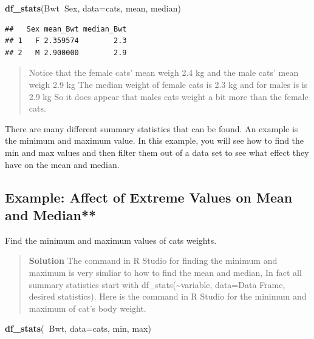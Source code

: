 \documentclass[]{book}
\newenvironment{Shaded}{\begin{snugshade}}{\end{snugshade}}
\newcommand{\DataTypeTok}[1]{\textcolor[rgb]{0.13,0.29,0.53}{#1}}
\newcommand{\KeywordTok}[1]{\textcolor[rgb]{0.13,0.29,0.53}{\textbf{#1}}}
\newcommand{\NormalTok}[1]{#1}
\newcommand{\OperatorTok}[1]{\textcolor[rgb]{0.81,0.36,0.00}{\textbf{#1}}}
\begin{document}
\begin{Shaded}
\begin{Highlighting}[]
\KeywordTok{df_stats}\NormalTok{(Bwt}\OperatorTok{~}\NormalTok{Sex, }\DataTypeTok{data=}\NormalTok{cats, mean, median)}
\end{Highlighting}
\end{Shaded}

\begin{verbatim}
##   Sex mean_Bwt median_Bwt
## 1   F 2.359574        2.3
## 2   M 2.900000        2.9
\end{verbatim}

\begin{quote}
Notice that the female cats' mean weigh 2.4 kg and the male cats' mean weigh 2.9 kg The median weight of female cats is 2.3 kg and for males is is 2.9 kg So it does appear that males cats weight a bit more than the female cats.
\end{quote}

There are many different summary statistics that can be found. An example is the minimum and maximum value. In this example, you will see how to find the min and max values and then filter them out of a data set to see what effect they have on the mean and median.

\hypertarget{example-affect-of-extreme-values-on-mean-and-median}{%
\subsection{Example: Affect of Extreme Values on Mean and Median**}\label{example-affect-of-extreme-values-on-mean-and-median}}

Find the minimum and maximum values of cats weights.

\begin{quote}
\textbf{Solution}
The command in R Studio for finding the minimum and maximum is very simliar to how to find the mean and median, In fact all summary statistics start with df\_stats(\textasciitilde{}variable, data=Data Frame, desired statistics). Here is the command in R Studio for the minimum and maximum of cat's body weight.
\end{quote}

\begin{Shaded}
\begin{Highlighting}[]
\KeywordTok{df_stats}\NormalTok{(}\OperatorTok{~}\NormalTok{Bwt, }\DataTypeTok{data=}\NormalTok{cats, min, max)}
\end{Highlighting}
\end{Shaded}
\end{document}
